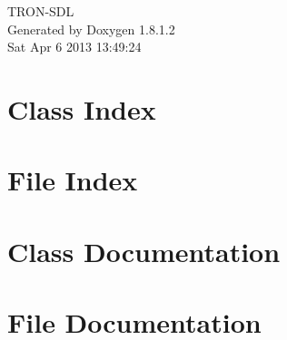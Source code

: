 \documentclass{book}
\begin{document}
\hypersetup{pageanchor=false,citecolor=blue}
\begin{titlepage}
\vspace*{7cm}
\begin{center}
{\Large T\-R\-O\-N-\/\-S\-D\-L }\\
\vspace*{1cm}
{\large Generated by Doxygen 1.8.1.2}\\
\vspace*{0.5cm}
{\small Sat Apr 6 2013 13:49:24}\\
\end{center}
\end{titlepage}
\clearemptydoublepage
{}
\tableofcontents
\clearemptydoublepage
{}
\hypersetup{pageanchor=true,citecolor=blue}
\chapter{Class Index}

\chapter{File Index}

\chapter{Class Documentation}








\chapter{File Documentation}



















\printindex
\end{document}
